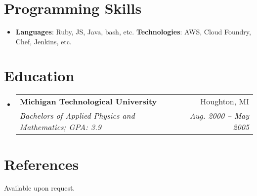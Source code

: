 \documentclass[letterpaper,12pt]{article}
\makeatletter
\newcommand{\resumeSubheading}[4]{
  \vspace{-1pt}\item{
    \begin{tabular*}{0.97\textwidth}{l@{\extracolsep{\fill}}r}
      \textbf{#1} & #2 \\
      \textit{\small#3} & \textit{\small #4} \\
    \end{tabular*}\vspace{-5pt}}
}
\newcommand{\resumeSubHeadingListStart}{\begin{itemize}[leftmargin=*]}
\newcommand{\resumeSubHeadingListEnd}{\end{itemize}}
\makeatother
\begin{document}
  \section{Programming Skills}
  \resumeSubHeadingListStart
    \item{
      \textbf{Languages}{: Ruby, JS, Java, bash, etc.}
        \hfill
      \textbf{Technologies}{: AWS, Cloud Foundry, Chef, Jenkins, etc.}
    }
  \resumeSubHeadingListEnd

  \section{Education}
  \resumeSubHeadingListStart
  \resumeSubheading
  {Michigan Technological University}{Houghton, MI}
  {Bachelors of Applied Physics and Mathematics;  GPA: 3.9}{Aug. 2000 -- May 2005}
  \resumeSubHeadingListEnd

  \section{References}
  Available upon request.

\end{document}
